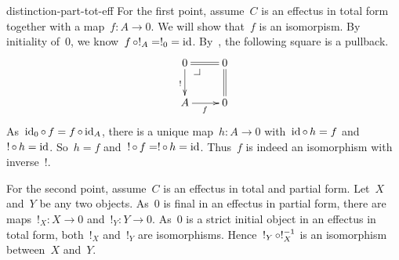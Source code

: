 \begin{solution}{distinction-part-tot-eff}%
For the first point, assume~$C$ is an effectus in total form
    together with a map~$f\colon A \to 0$.
    We will show that~$f$ is an isomorpism.
    By initiality of~$0$, we know~$f \mathop{\circ} !_A = !_0 = \mathrm{id}$.
By~, the following square is a pullback.
\begin{equation*}
    \xymatrix{
        0 \pullback \ar[d]_{!} \ar@{=}[r]
        & 0 \ar@{=}[d]
        \\
        A \ar[r]_{f}
        & 0
    }
\end{equation*}
As~$\mathrm{id}_0 \mathop{\circ} f = f \mathop{\circ} \mathrm{id}_A$,
    there is a unique map~$h\colon A \to 0$
        with~$\mathrm{id} \mathop{\circ} h = f$ and~$! \mathop{\circ} h = \mathrm{id}$.
So~$h = f$ and~$! \mathop{\circ} f = ! \mathop{\circ} h = \mathrm{id}$.
Thus~$f$ is indeed an isomorphism with inverse~$!$.

For the second point, assume~$C$ is an effectus in total and partial form.
Let~$X$ and~$Y$ be any two objects.
As~$0$ is final in an effectus in partial form,
    there are maps~$!_X \colon X \to 0$ and~$!_Y \colon Y \to 0$.
As~$0$ is a strict initial object in an effectus in total form,
    both~$!_X$ and~$!_Y$ are isomorphisms.
Hence~$!_Y \mathop{\circ} !_X^{-1}$ is an isomorphism between~$X$ and~$Y$.
\end{solution}
